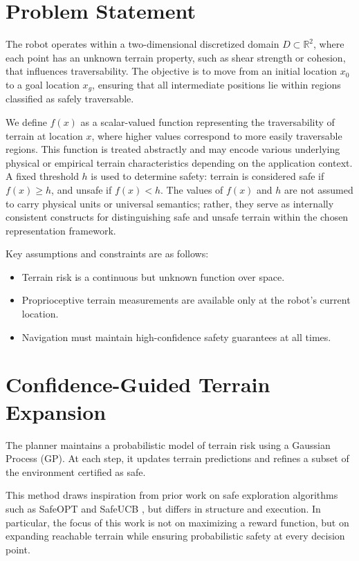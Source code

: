 \section{Problem Statement}
\label{sec:Problem_Formulation}

The robot operates within a two-dimensional discretized domain \( D \subset \mathbb{R}^2 \), where each point has an unknown terrain property, such as shear strength or cohesion, that influences traversability. The objective is to move from an initial location \( x_0 \) to a goal location \( x_g \), ensuring that all intermediate positions lie within regions classified as safely traversable.

We define \( f(x) \) as a scalar-valued function representing the traversability of terrain at location \( x \), where higher values correspond to more easily traversable regions. This function is treated abstractly and may encode various underlying physical or empirical terrain characteristics depending on the application context. A fixed threshold \( h \) is used to determine safety: terrain is considered safe if \( f(x) \geq h \), and unsafe if \( f(x) < h \). The values of \( f(x) \) and \( h \) are not assumed to carry physical units or universal semantics; rather, they serve as internally consistent constructs for distinguishing safe and unsafe terrain within the chosen representation framework.


Key assumptions and constraints are as follows:
\begin{itemize}
    \item Terrain risk is a continuous but unknown function over space.
    \item Proprioceptive terrain measurements are available only at the robot’s current location.
    \item Navigation must maintain high-confidence safety guarantees at all times.
\end{itemize}

\section{Confidence-Guided Terrain Expansion}
\label{sec:ConfidenceGuided}

The planner maintains a probabilistic model of terrain risk using a Gaussian Process (GP). At each step, it updates terrain predictions and refines a subset of the environment certified as safe.

This method draws inspiration from prior work on safe exploration algorithms such as SafeOPT and SafeUCB \cite{safeopt, losalka2023msafeucb}, but differs in structure and execution. In particular, the focus of this work is not on maximizing a reward function, but on expanding reachable terrain while ensuring probabilistic safety at every decision point.

